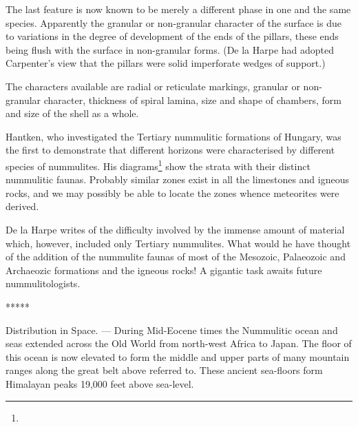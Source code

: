 \documentclass[a4paper, 12pt, oneside]{article}
\begin{document}
The last feature is now known to be merely a different phase in one and the same species. Apparently the granular or non-granular character of the surface is due to variations in the degree of development of the ends of the pillars, these ends being flush with the surface in non-granular forms. (De la Harpe had adopted Carpenter's view that the pillars were solid imperforate wedges of support.)

The characters available are radial or reticulate markings, granular or non-granular character, thickness of spiral lamina, size and shape of chambers, form and size of the shell as a whole.

Hantken, who investigated the Tertiary nummulitic formations of Hungary, was the first to demonstrate that different horizons were characterised by different species of nummulites. His diagrams\footnote{} show the strata with their distinct nummulitic faunas. Probably similar zones exist in all the limestones and igneous rocks, and we may possibly be able to locate the zones whence meteorites were derived.

De la Harpe writes of the difficulty involved by the immense amount of material which, however, included only Tertiary nummulites. What would he have thought of the addition of the nummulite faunas of most of the Mesozoic, Palaeozoic and Archaeozic formations and the igneous rocks! A gigantic task awaits future nummulitologists.

\centerline{*\hspace{15mm}*\hspace{15mm}*\hspace{15mm}*\hspace{15mm}*}
\bigskip

Distribution in Space. --- During Mid-Eocene times the Nummulitic ocean and seas extended across the Old World from north-west Africa to Japan. The floor of this ocean is now elevated to form the middle and upper parts of many mountain ranges along the great belt above referred to. These ancient sea-floors form Himalayan peaks 19,000 feet above sea-level.
\end{document}
